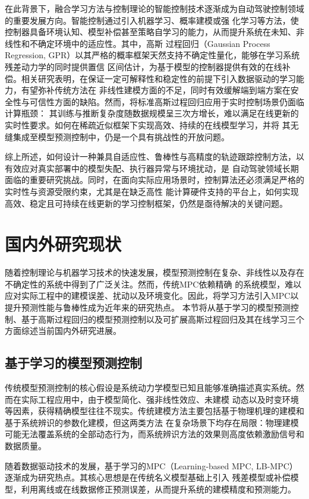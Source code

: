 在此背景下，融合学习方法与控制理论的智能控制技术逐渐成为自动驾驶控制领域的重要发展方向。智能控制通过引入机器学习、概率建模或强
化学习等方法，使控制器具备环境认知、模型补偿甚至策略自学习的能力，从而提升系统在未知、非线性和不确定环境中的适应性。其中，高斯
过程回归（Gaussian Process Regression, GPR）以其严格的概率框架天然支持不确定性量化，能够在学习系统残差动力学的同时提供置信
区间估计，为基于模型的控制器提供有效的在线补偿。相关研究表明，在保证一定可解释性和稳定性的前提下引入数据驱动的学习能力，有望弥补传统方法在
非线性建模方面的不足，同时有效缓解端到端方案在安全性与可信性方面的缺陷。然而，将标准高斯过程回归应用于实时控制场景仍面临计算瓶颈：
其训练与推断复杂度随数据规模呈三次方增长，难以满足在线更新的实时性要求。如何在稀疏近似框架下实现高效、持续的在线模型学习，并将
其无缝集成至模型预测控制中，仍是一个具有挑战性的开放问题。

综上所述，如何设计一种兼具自适应性、鲁棒性与高精度的轨迹跟踪控制方法，以有效应对真实部署中的模型失配、执行器异常与环境扰动，是
自动驾驶领域长期面临的重要研究挑战。同时，在面向实际应用场景时，控制算法还必须满足严格的实时性与资源受限约束，尤其是在缺乏高性
能计算硬件支持的平台上，如何实现高效、稳定且可持续在线更新的学习控制框架，仍然是亟待解决的关键问题。

\section{国内外研究现状}

随着控制理论与机器学习技术的快速发展，模型预测控制在复杂、非线性以及存在不确定性的系统中得到了广泛关注。然而，传统MPC依赖精确
的系统模型，难以应对实际工程中的建模误差、扰动以及环境变化。因此，将学习方法引入MPC以提升预测性能与鲁棒性成为近年来的研究热点。
本节将从基于学习的模型预测控制、基于高斯过程回归的模型预测控制以及可扩展高斯过程回归及其在线学习三个方面综述当前国内外研究进展。

\subsection{基于学习的模型预测控制}

传统模型预测控制的核心假设是系统动力学模型已知且能够准确描述真实系统。然而在实际工程应用中，由于模型简化、强非线性效应、未建模
动态以及时变环境等因素，获得精确模型往往不现实。传统建模方法主要包括基于物理机理的建模和基于系统辨识的参数化建模，但这两类方法
在复杂场景下均存在局限：物理建模可能无法覆盖系统的全部动态行为，而系统辨识方法的效果则高度依赖激励信号和数据质量。

随着数据驱动技术的发展，基于学习的MPC（Learning-based MPC, LB-MPC）逐渐成为研究热点。其核心思想是在传统名义模型基础上引入
残差模型或补偿模型，利用离线或在线数据修正预测误差，从而提升系统的建模精度和预测能力\cite{wu2019ml_mpc_part2}。

